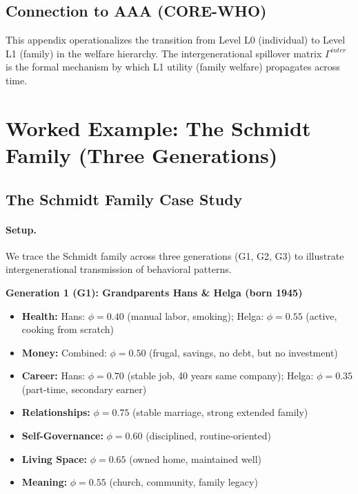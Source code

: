 \subsection{Connection to AAA (CORE-WHO)}

This appendix operationalizes the transition from Level L0 (individual) to Level L1 (family)
in the welfare hierarchy. The intergenerational spillover matrix $\Gamma^{inter}$ is the
formal mechanism by which L1 utility (family welfare) propagates across time.



\section{Worked Example: The Schmidt Family (Three Generations)}
\label{sec:BI-example}

\subsection{The Schmidt Family Case Study}

\paragraph{Setup.} We trace the Schmidt family across three generations (G1, G2, G3) to
illustrate intergenerational transmission of behavioral patterns.

\textbf{Generation 1 (G1): Grandparents Hans \& Helga (born 1945)}
\begin{itemize}[nosep]
\item \textbf{Health:} Hans: $\phi = 0.40$ (manual labor, smoking); Helga: $\phi = 0.55$ (active, cooking from scratch)
\item \textbf{Money:} Combined: $\phi = 0.50$ (frugal, savings, no debt, but no investment)
\item \textbf{Career:} Hans: $\phi = 0.70$ (stable job, 40 years same company); Helga: $\phi = 0.35$ (part-time, secondary earner)
\item \textbf{Relationships:} $\phi = 0.75$ (stable marriage, strong extended family)
\item \textbf{Self-Governance:} $\phi = 0.60$ (disciplined, routine-oriented)
\item \textbf{Living Space:} $\phi = 0.65$ (owned home, maintained well)
\item \textbf{Meaning:} $\phi = 0.55$ (church, community, family legacy)
\end{itemize}

